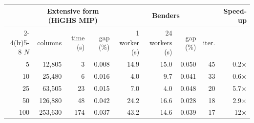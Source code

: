 \begin{tabular}{@{}rrrrrrrrr@{}}\toprule
 & \multicolumn{3}{c}{Extensive form (HiGHS MIP)} & \multicolumn{4}{c}{Benders} & Speed-up \\
\cmidrule(lr){2-4}\cmidrule(lr){5-8}
$N$ & columns & time (s) & gap (\%) & 1 worker (s) & 24 workers (s) & gap (\%) & iter. & \\ \midrule
5 & 12{,}805 & 3 & 0.008 & 14.9 & 15.0 & 0.050 & 45 & 0.2$\times$ \\
10 & 25{,}480 & 6 & 0.016 & 4.0 & 9.7 & 0.041 & 33 & 0.6$\times$ \\
25 & 63{,}505 & 23 & 0.015 & 7.0 & 4.0 & 0.048 & 20 & 5.7$\times$ \\
50 & 126{,}880 & 48 & 0.042 & 24.2 & 16.6 & 0.028 & 18 & 2.9$\times$ \\
100 & 253{,}630 & 174 & 0.037 & 43.2 & 14.6 & 0.039 & 17 & 12$\times$ \\
\bottomrule\end{tabular}
